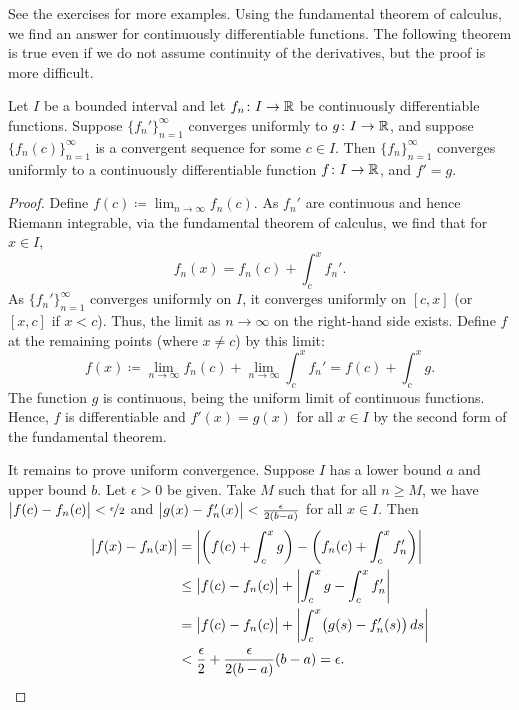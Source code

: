See the exercises for more examples.  Using 
the fundamental theorem of calculus, we find an answer for continuously
differentiable functions.  The following theorem is true even if 
we do not assume continuity of the derivatives, but the proof is more
difficult.

\begin{thm} \label{thm:dersconverge}
Let $I$ be a bounded interval and let
$f_n \colon I \to {\mathbb{R}}$ be continuously differentiable functions.
Suppose $\{ f_n' \}_{n=1}^\infty$ converges uniformly to $g \colon I \to {\mathbb{R}}$,
and suppose $\bigl\{ f_n(c) \bigr\}_{n=1}^\infty$ is a
convergent sequence for some $c \in I$.  Then $\{ f_n \}_{n=1}^\infty$ converges uniformly to 
a continuously differentiable function $f \colon I \to {\mathbb{R}}$, and $f' = g$.
\end{thm}

\begin{proof}
Define $f(c) \coloneqq \lim_{n\to \infty} f_n(c)$.
As $f_n'$ are continuous and hence Riemann integrable,
via the fundamental theorem of calculus, we find that for $x \in I$,
\begin{equation*}
f_n(x) = f_n(c) + \int_c^x f_n' .
\end{equation*}
As $\{ f_n' \}_{n=1}^\infty$ converges uniformly on $I$, it converges uniformly
on $[c,x]$ (or $[x,c]$ if $x < c$).
Thus, the limit as $n \to \infty$ on the right-hand side exists.
Define $f$ at the remaining points (where $x\neq c$) by this limit:
\begin{equation*}
f(x) \coloneqq
\lim_{n\to\infty} f_n(c) + \lim_{n\to\infty} \int_c^x f_n'
=
f(c) + \int_c^x g .
\end{equation*}
The function $g$ is continuous, being the uniform limit of continuous
functions.  Hence, $f$ is differentiable and $f'(x) = g(x)$ for all $x \in I$
by the second form of the fundamental theorem.

It remains to prove
uniform convergence.
Suppose $I$ has a lower bound $a$ and upper bound $b$.
Let $\epsilon > 0$ be given.  Take $M$
such that for all $n \geq M$, we have
$\bigl\lvert {f(c)-f_n(c)} \bigr\rvert < \nicefrac{\epsilon}{2}$
and
$\bigl\lvert {g(x)-f_n'(x)} \bigr\rvert < \frac{\epsilon}{2(b-a)}$
for all $x \in I$.  Then
\begin{equation*}
\begin{split}
\bigl\lvert {f(x) - f_n(x)} \bigr\rvert & =
\left\lvert {\left(f(c) + \int_c^x g\right) - \left( f_n(c) + \int_c^x f_n' \right)} \right\rvert
\\
& \leq
\bigl\lvert {f(c) - f_n(c)} \bigr\rvert + \left\lvert {\int_c^x g - \int_c^x f_n'} \right\rvert
\\
& =
\bigl\lvert {f(c) - f_n(c)} \bigr\rvert + \left\lvert {\int_c^x \bigl(g(s) - f_n'(s)\bigr) \, ds} \right\rvert
\\
& <
\frac{\epsilon}{2}
+
\frac{\epsilon}{2(b-a)}
(b-a)
=\epsilon. \qedhere
\end{split}
\end{equation*}
\end{proof}

